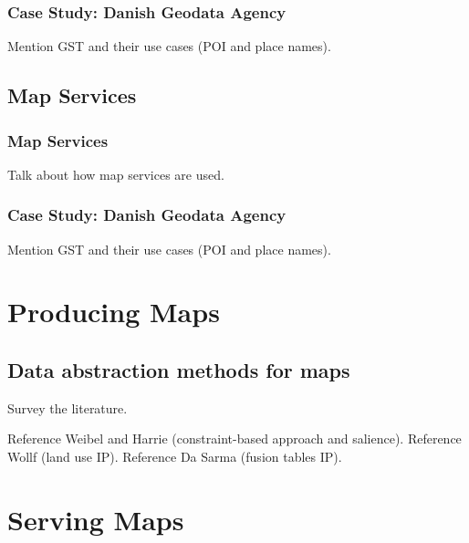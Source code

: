 \documentclass[11pt, oneside]{report}   	%
\begin{document}
\section{Case Study: Danish Geodata Agency}
Mention GST and their use cases (POI and place names).

\chapter{Map Services}

\section{Map Services}
Talk about how map services are used.

\section{Case Study: Danish Geodata Agency}
Mention GST and their use cases (POI and place names).


\part{Producing Maps}

\chapter{Data abstraction methods for maps}
Survey the literature.

Reference Weibel and Harrie (constraint-based approach and salience). Reference Wollf (land use IP). Reference Da Sarma (fusion tables IP).


\chapter{}


\part{Serving Maps}



\end{document}
